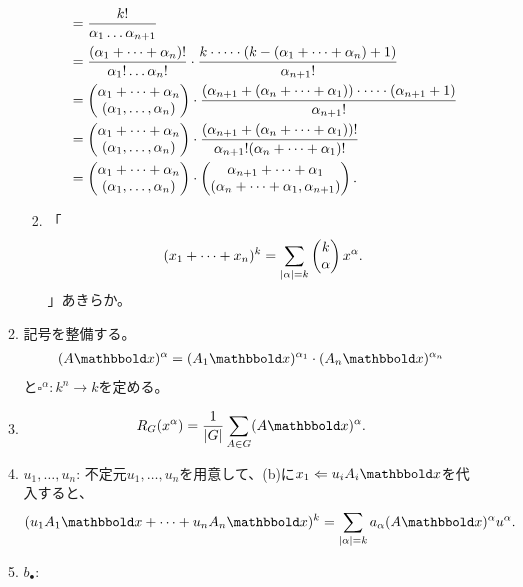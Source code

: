 \begin{myproof}
\begin{enumerate}
\begin{enumerate}
\begin{enumerate}
\begin{align}
           &=
           \frac{k!}{\alpha_1 \dots \alpha_{n+1}}\\
           &=
           \frac{(\alpha_1+\dots+\alpha_n)!}{\alpha_1!\dots\alpha_n!} \cdot \frac{k\cdot \dots \cdot (k-(\alpha_1+\dots+\alpha_n)+1)}{\alpha_{n+1}!}\\
           &=
           \left(\begin{matrix} \alpha_1+\dots+\alpha_n \\ (\alpha_1,\dots,\alpha_n) \end{matrix}\right) \cdot \frac{(\alpha_{n+1}+(\alpha_n+\dots+\alpha_1))\cdot \dots \cdot (\alpha_{n+1}+1)}{\alpha_{n+1}!}\\
           &=
           \left(\begin{matrix} \alpha_1+\dots+\alpha_n \\ (\alpha_1,\dots,\alpha_n) \end{matrix}\right) \cdot \frac{(\alpha_{n+1}+(\alpha_n+\dots+\alpha_1))!}{\alpha_{n+1}! (\alpha_n + \dots + \alpha_1)!}\\
           &=
           \left(\begin{matrix} \alpha_1+\dots+\alpha_n \\ (\alpha_1,\dots,\alpha_n) \end{matrix}\right) \cdot \left(\begin{matrix} \alpha_{n+1} + \dots + \alpha_1 \\ (\alpha_n+\dots+\alpha_1, \alpha_{n+1}) \end{matrix}\right).
         \end{align}
         \item
         「
         \begin{align}
           (x_1+\dots+x_n)^k = \sum_{\left|\alpha\right|=k}\left(\begin{matrix} k\\\alpha \end{matrix}\right)x^\alpha.
         \end{align}」あきらか。
       \end{enumerate}
       \item
       記号を整備する。
       \begin{align}
         (A\bbold x)^\alpha
         =
         (A_1\bbold x)^{\alpha_1} \cdot (A_n \bbold x)^{\alpha_n}
       \end{align}
       と$\square^{\alpha}\colon k^n \to k$を定める。
       \item
       \begin{align}
         R_G(x^\alpha)
         =
         \frac{1}{\myabs{G}}\sum_{A\in G}(A\bbold x)^\alpha .
       \end{align}
       \item $u_1,\dots,u_n$:
       不定元$u_1,\dots,u_n$を用意して、(b)に$x_1 \Leftarrow u_i A_i \bbold x$を代入すると、
       \begin{align}
         (u_1 A_1 \bbold x + \dots + u_n A_n \bbold x)^k = \sum_{\myabs{\alpha}=k}a_\alpha (A\bbold x)^\alpha u^\alpha.
       \end{align}
       \item $b_\bullet$:

\end{enumerate}
\end{enumerate}
\end{myproof}
